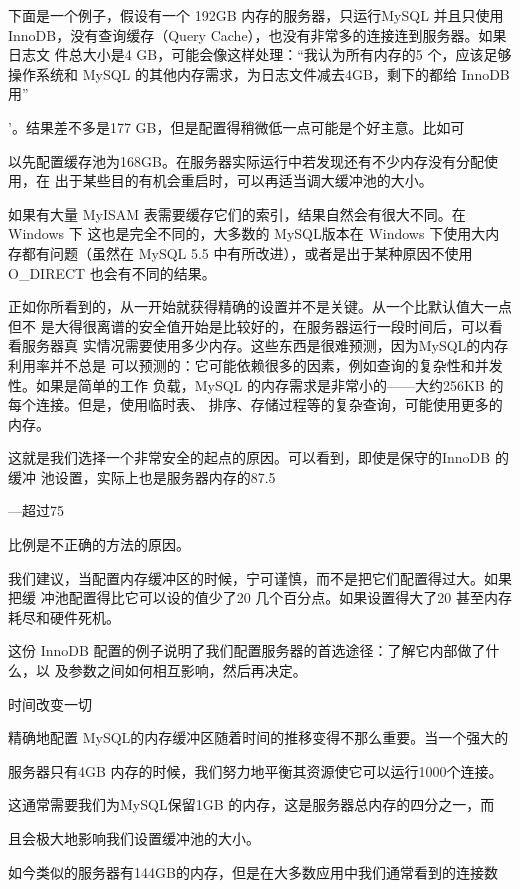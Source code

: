 下面是一个例子，假设有一个 192GB 内存的服务器，只运行MySQL 并且只使用
InnoDB，没有查询缓存（Query Cache），也没有非常多的连接连到服务器。如果日志文
件总大小是4 GB，可能会像这样处理：“我认为所有内存的5%
个，应该足够操作系统和 MySQL 的其他内存需求，为日志文件减去4GB，剩下的都给
InnoDB用”

’。结果差不多是177 GB，但是配置得稍微低一点可能是个好主意。比如可

以先配置缓存池为168GB。在服务器实际运行中若发现还有不少内存没有分配使用，在
出于某些目的有机会重启时，可以再适当调大缓冲池的大小。

如果有大量 MyISAM 表需要缓存它们的索引，结果自然会有很大不同。在Windows 下
这也是完全不同的，大多数的 MySQL版本在 Windows 下使用大内存都有问题（虽然在
MySQL 5.5 中有所改进），或者是出于某种原因不使用O\_DIRECT 也会有不同的结果。

正如你所看到的，从一开始就获得精确的设置并不是关键。从一个比默认值大一点但不
是大得很离谱的安全值开始是比较好的，在服务器运行一段时间后，可以看看服务器真
实情况需要使用多少内存。这些东西是很难预测，因为MySQL的内存利用率并不总是
可以预测的：它可能依赖很多的因素，例如查询的复杂性和并发性。如果是简单的工作
负载，MySQL 的内存需求是非常小的——大约256KB 的每个连接。但是，使用临时表、
排序、存储过程等的复杂查询，可能使用更多的内存。

这就是我们选择一个非常安全的起点的原因。可以看到，即使是保守的InnoDB 的缓冲
池设置，实际上也是服务器内存的87.5%

—超过75%

比例是不正确的方法的原因。

我们建议，当配置内存缓冲区的时候，宁可谨慎，而不是把它们配置得过大。如果把缓
冲池配置得比它可以设的值少了20%
几个百分点。如果设置得大了20%
甚至内存耗尽和硬件死机。

这份 InnoDB 配置的例子说明了我们配置服务器的首选途径：了解它内部做了什么，以
及参数之间如何相互影响，然后再决定。

时间改变一切

精确地配置 MySQL的内存缓冲区随着时间的推移变得不那么重要。当一个强大的

服务器只有4GB 内存的时候，我们努力地平衡其资源使它可以运行1000个连接。

这通常需要我们为MySQL保留1GB 的内存，这是服务器总内存的四分之一，而

且会极大地影响我们设置缓冲池的大小。

如今类似的服务器有144GB的内存，但是在大多数应用中我们通常看到的连接数

